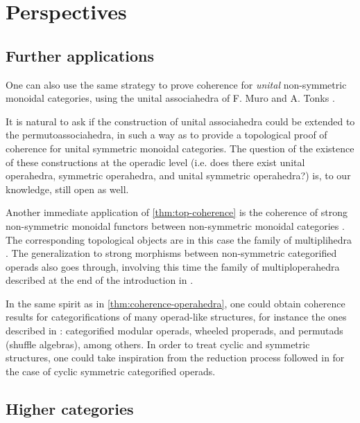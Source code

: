 
\section{Perspectives}


\subsection{Further applications} 
\label{sec:further}
One can also use the same strategy to prove coherence for \emph{unital} non-symmetric monoidal categories, using the unital associahedra of F. Muro and A. Tonks \cite{muroUnitalAssociahedra2014}.

It is natural to ask if the construction of unital associahedra could be extended to the permutoassociahedra, in such a way as to provide a topological proof of coherence for unital symmetric monoidal categories. 
The question of the existence of these constructions at the operadic level (i.e. does there exist unital operahedra, symmetric operahedra, and unital symmetric operahedra?) is, to our knowledge, still open as well. 

Another immediate application of \cref{thm:top-coherence} is the coherence of strong non-symmetric monoidal functors between non-symmetric monoidal categories \cite{epsteinFunctorsTensoredCategories1966}. 
The corresponding topological objects are in this case the family of multiplihedra \cite{Stasheff70,Forcey08}.
The generalization to strong morphisms between non-symmetric categorified operads also goes through, involving this time the family of multiploperahedra described at the end of the introduction in \cite{MazuirLA22}.

In the same spirit as in \cref{thm:coherence-operahedra}, one could obtain coherence results for categorifications of many operad-like structures, for instance the ones described in \cite{BMO20}: categorified modular operads, wheeled properads, and permutads (shuffle algebras), among others.
In order to treat cyclic and symmetric structures, one could take inspiration from the reduction process followed in \cite{curienCategorifiedCyclicOperads2020} for the case of cyclic symmetric categorified operads.

\subsection{Higher categories} 
\label{sec:higher}

